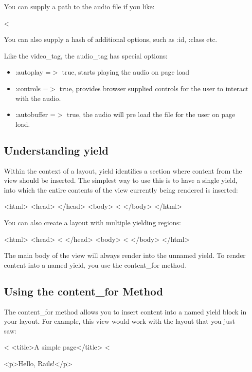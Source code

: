 \documentclass[10pt]{book}
\newenvironment{code}{%
  \scriptsize
    \verbatim
}{%
    \endverbatim
    \newline
}
\begin{document}
You can supply a path to the audio file if you like:
\begin{code}
<%
\end{code}

You can also supply a hash of additional options, such as :id, :class etc.

Like the video\_tag, the audio\_tag has special options:
\begin{itemize}
	\item :autoplay =$>$ true, starts playing the audio on page load
	\item :controls =$>$ true, provides browser supplied controls for the user to interact with the audio.
	\item :autobuffer =$>$ true, the audio will pre load the file for the user on page load.
\end{itemize}

\subsection{ Understanding yield}

Within the context of a layout, yield identifies a section where content from the view should be inserted. The simplest way to use this is to have a single yield, into which the entire contents of the view currently being rendered is inserted:
\begin{code}
<html>
  <head>
  </head>
  <body>
  <%
  </body>
</html>
\end{code}

You can also create a layout with multiple yielding regions:
\begin{code}
<html>
  <head>
  <%
  </head>
  <body>
  <%
  </body>
</html>
\end{code}

The main body of the view will always render into the unnamed yield. To render content into a named yield, you use the content\_for method.

\subsection{ Using the content\_for Method}

The content\_for method allows you to insert content into a named yield block in your layout. For example, this view would work with the layout that you just saw:
\begin{code}
<%
  <title>A simple page</title>
<%
 
<p>Hello, Rails!</p>
\end{code}
\end{document}
